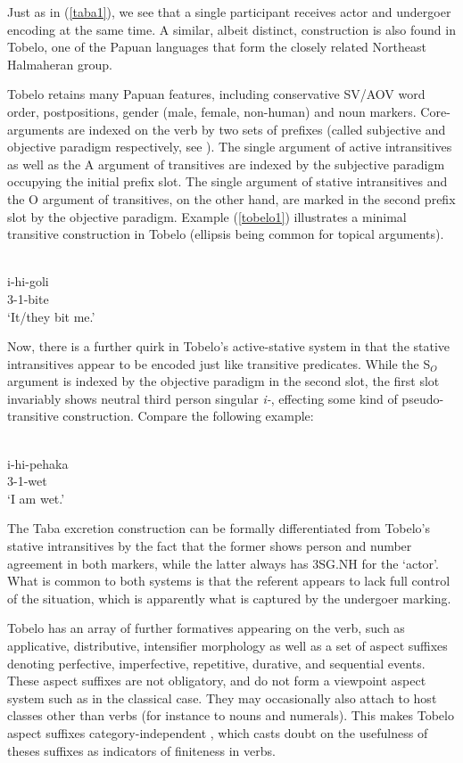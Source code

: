 Just as in (\ref{taba1}), we see that a single participant receives actor and undergoer encoding at the same time. A similar, albeit distinct, construction is also found in Tobelo, one of the Papuan languages that form the closely related Northeast Halmaheran group.

Tobelo retains many Papuan features, including conservative SV/AOV word order, postpositions, gender (male, female, non-human) and noun markers. Core-arguments are indexed on the verb by two sets of prefixes (called subjective and objective paradigm respectively, see \citealt[38]{holton2003tobelo}). The single argument of active intransitives as well as the A argument of transitives are indexed by the subjective paradigm occupying the initial prefix slot. The single argument of stative intransitives and the O argument of transitives, on the other hand, are marked in the second prefix slot by the objective paradigm. Example (\ref{tobelo1}) illustrates a minimal transitive construction in Tobelo (ellipsis being common for topical arguments).

\ea \label{tobelo1}
\\
\gll i-hi-goli \\
3-1-bite \\
\glft `It/they bit me.' 
\z

Now, there is a further quirk in Tobelo's active-stative system in that the stative intransitives appear to be encoded just like transitive predicates. While the S$_O$ argument is indexed by the objective paradigm in the second slot, the first slot invariably shows neutral third person singular \textit{i-}, effecting some kind of pseudo-transitive construction. Compare the following example:

\ea 
{}\\
\gll i-hi-pehaka \\
3-1-wet \\
\glft `I am wet.'
\z

The Taba excretion construction can be formally differentiated from Tobelo's stative intransitives by the fact that the former shows person and number agreement in both markers, while the latter always has 3SG.NH for the `actor'. What is common to both systems is that the referent appears to lack full control of the situation, which is apparently what is captured by the undergoer marking.

Tobelo has an array of further formatives appearing on the verb, such as applicative, distributive, intensifier morphology as well as a set of aspect suffixes denoting perfective, imperfective, repetitive, durative, and sequential events. These aspect suffixes are not obligatory, and do not form a viewpoint aspect system such as in the classical  case. They may occasionally also attach to host classes other than verbs (for instance to nouns and numerals). This makes Tobelo aspect suffixes category-independent \citep[44]{holton2003tobelo}, which casts doubt on the usefulness of theses suffixes as indicators of finiteness in verbs. 

